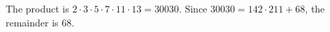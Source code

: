 The product is $2\cdot3\cdot5\cdot7\cdot11\cdot13=30030$. Since $30030=142\cdot211+68$, the remainder is $\boxed{68}$.
